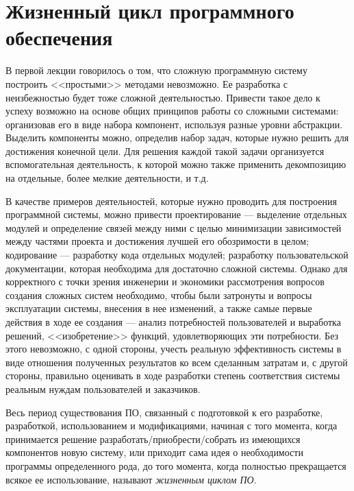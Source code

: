 \documentclass{../../text-style}
\begin{document}
\maketitle
\thispagestyle{empty}


\section{Жизненный цикл программного обеспечения}

В первой лекции говорилось о том, что сложную программную систему построить <<простыми>> методами невозможно. Ее разработка с неизбежностью будет тоже сложной деятельностью. Привести такое дело к успеху возможно на основе общих принципов работы со сложными системами: организовав его в виде набора компонент, используя разные уровни абстракции. Выделить компоненты можно, определив набор задач, которые нужно решить для достижения конечной цели. Для решения каждой такой задачи организуется вспомогательная деятельность, к которой можно также применить декомпозицию на отдельные, более мелкие деятельности, и т.д.

В качестве примеров деятельностей, которые нужно проводить для построения программной системы, можно привести проектирование --- выделение отдельных модулей и определение связей между ними с целью минимизации зависимостей между частями проекта и достижения лучшей его обозримости в целом; кодирование --- разработку кода отдельных модулей; разработку пользовательской документации, которая необходима для достаточно сложной системы. Однако для корректного с точки зрения инженерии и экономики рассмотрения вопросов создания сложных систем необходимо, чтобы были затронуты и вопросы эксплуатации системы, внесения в нее изменений, а также самые первые действия в ходе ее создания --- анализ потребностей пользователей и выработка решений, <<изобретение>> функций, удовлетворяющих эти потребности. Без этого невозможно, с одной стороны, учесть реальную эффективность системы в виде отношения полученных результатов ко всем сделанным затратам и, с другой стороны, правильно оценивать в ходе разработки степень соответствия системы реальным нуждам пользователей и заказчиков.

Весь период существования ПО, связанный с подготовкой к его разработке, разработкой, использованием и модификациями, начиная с того момента, когда принимается решение разработать/приобрести/собрать из имеющихся компонентов новую систему, или приходит сама идея о необходимости программы определенного рода, до того момента, когда полностью прекращается всякое ее использование, называют \emph{жизненным циклом ПО}.
\end{document}
